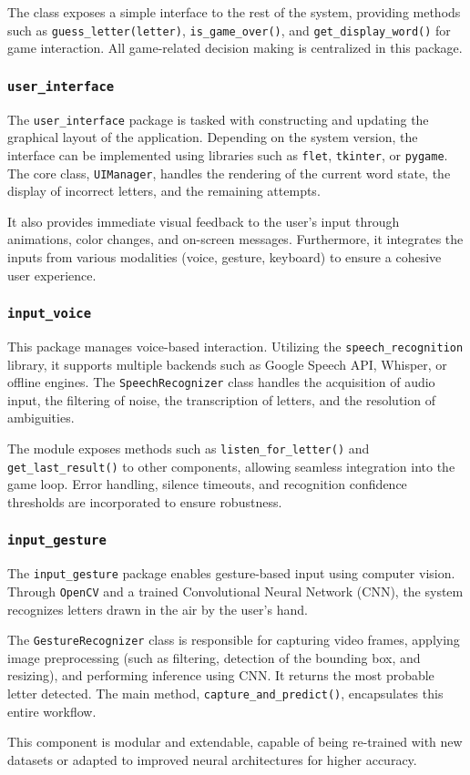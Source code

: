 The class exposes a simple interface to the rest of the system, providing methods such as \texttt{guess\_letter(letter)}, \texttt{is\_game\_over()}, and \texttt{get\_display\_word()} for game interaction. All game-related decision making is centralized in this package.

\subsubsection{\texttt{user\_interface}}
The \texttt{user\_interface} package is tasked with constructing and updating the graphical layout of the application. Depending on the system version, the interface can be implemented using libraries such as \texttt{flet}, \texttt{tkinter}, or \texttt{pygame}. The core class, \texttt{UIManager}, handles the rendering of the current word state, the display of incorrect letters, and the remaining attempts.

It also provides immediate visual feedback to the user's input through animations, color changes, and on-screen messages. Furthermore, it integrates the inputs from various modalities (voice, gesture, keyboard) to ensure a cohesive user experience.

\subsubsection{\texttt{input\_voice}}
This package manages voice-based interaction. Utilizing the \texttt{speech\_recognition} library, it supports multiple backends such as Google Speech API, Whisper, or offline engines. The \texttt{SpeechRecognizer} class handles the acquisition of audio input, the filtering of noise, the transcription of letters, and the resolution of ambiguities.

The module exposes methods such as \texttt{listen\_for\_letter()} and \texttt{get\_last\_result()} to other components, allowing seamless integration into the game loop. Error handling, silence timeouts, and recognition confidence thresholds are incorporated to ensure robustness.

\subsubsection{\texttt{input\_gesture}}
The \texttt{input\_gesture} package enables gesture-based input using computer vision. Through \texttt{OpenCV} and a trained Convolutional Neural Network (CNN), the system recognizes letters drawn in the air by the user's hand.

The \texttt{GestureRecognizer} class is responsible for capturing video frames, applying image preprocessing (such as filtering, detection of the bounding box, and resizing), and performing inference using CNN. It returns the most probable letter detected. The main method, \texttt{capture\_and\_predict()}, encapsulates this entire workflow.

This component is modular and extendable, capable of being re-trained with new datasets or adapted to improved neural architectures for higher accuracy.
